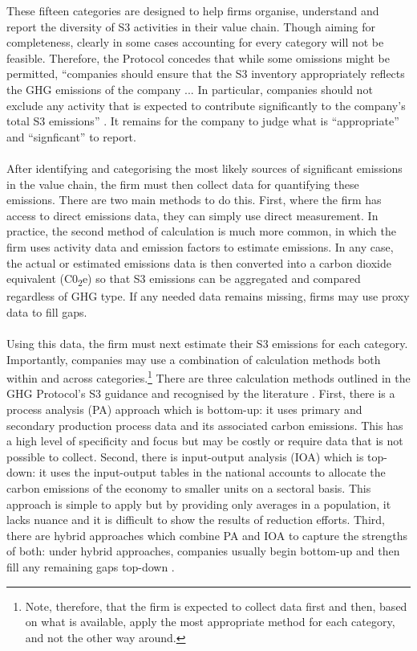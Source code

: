 \documentclass[12pt,twoside]{report}
\begin{document}
These fifteen categories are designed to help firms organise, understand and report the diversity of S3 activities in their value chain. Though aiming for completeness, clearly in some cases accounting for every category will not be feasible.  Therefore, the Protocol concedes that while some omissions might be permitted, ``companies should ensure that the S3 inventory appropriately reflects the GHG emissions of the company ... In particular, companies should not exclude any activity that is expected to contribute significantly to the company's total S3 emissions'' \cite{ghgscope32013}. It remains for the company to judge what is ``appropriate'' and ``signficant'' to report. 
\\ \\
After identifying and categorising the most likely sources of significant emissions in the value chain, the firm must then collect data for quantifying these emissions. There are two main methods to do this. First, where the firm has access to direct emissions data, they can simply use direct measurement. In practice, the second method of calculation is much more common, in which the firm uses activity data and emission factors to estimate emissions. In any case, the actual or estimated emissions data is then converted into a carbon dioxide equivalent (C0\textsubscript{2}e) so that S3 emissions can be aggregated and compared regardless of GHG type. If any needed data remains missing, firms may use proxy data to fill gaps. 
\\ \\
Using this data, the firm must next estimate their S3 emissions for each category. Importantly, companies may use a combination of calculation methods both within and across categories.\footnote{Note, therefore, that the firm is expected to collect data first and then, based on what is available, apply the most appropriate method for each category, and not the other way around.} There are three calculation methods outlined in the GHG Protocol's S3 guidance and recognised by the literature \cite{ghgscope32013, GoldhammerEtAl2017}. First, there is a process analysis (PA) approach which is bottom-up: it uses primary and secondary production process data and its associated carbon emissions. This has a high level of specificity and focus but may be costly or require data that is not possible to collect. Second, there is input-output analysis (IOA) which is top-down: it uses the input-output tables in the national accounts to allocate the carbon emissions of the economy to smaller units on a sectoral basis. This approach is simple to apply but by providing only averages in a population, it lacks nuance and it is difficult to show the results of reduction efforts. Third, there are hybrid approaches which combine PA and IOA to capture the strengths of both: under hybrid approaches, companies usually begin bottom-up and then fill any remaining gaps top-down \cite{Crawford2008}. 
\end{document}
